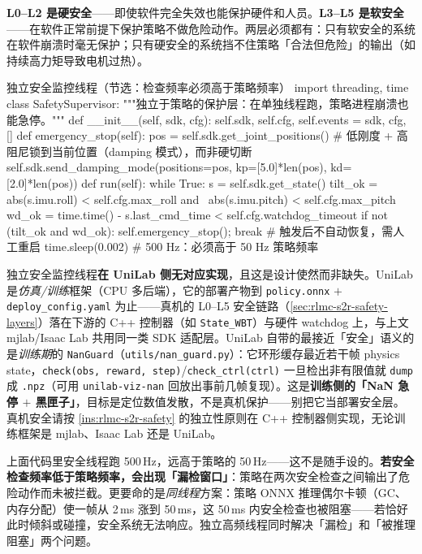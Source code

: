 \textbf{L0--L2 是硬安全}——即使软件完全失效也能保护硬件和人员。\textbf{L3--L5 是软安全}——在软件正常前提下保护策略不做危险动作。两层必须都有：只有软安全的系统在软件崩溃时毫无保护；只有硬安全的系统挡不住策略「合法但危险」的输出（如持续高力矩导致电机过热）。

\begin{codebox}[Python]{独立安全监控线程（节选：检查频率必须高于策略频率）}
import threading, time
class SafetySupervisor:
    """独立于策略的保护层：在单独线程跑，策略进程崩溃也能急停。"""
    def __init__(self, sdk, cfg):
        self.sdk, self.cfg, self.events = sdk, cfg, []
    def emergency_stop(self):
        pos = self.sdk.get_joint_positions()
        # 低刚度 + 高阻尼锁到当前位置（damping 模式），而非硬切断
        self.sdk.send_damping_mode(positions=pos,
                                   kp=[5.0]*len(pos), kd=[2.0]*len(pos))
    def run(self):
        while True:
            s = self.sdk.get_state()
            tilt_ok = abs(s.imu.roll) < self.cfg.max_roll and \
                      abs(s.imu.pitch) < self.cfg.max_pitch
            wd_ok   = time.time() - s.last_cmd_time < self.cfg.watchdog_timeout
            if not (tilt_ok and wd_ok):
                self.emergency_stop(); break        # 触发后不自动恢复，需人工重启
            time.sleep(0.002)                        # 500 Hz：必须高于 50 Hz 策略频率
\end{codebox}

\begin{note}
独立安全监控线程\textbf{在 UniLab 侧无对应实现}，且这是设计使然而非缺失。UniLab 是\emph{仿真/训练}框架（CPU 多后端），它的部署产物到 \verb|policy.onnx| $+$ \verb|deploy_config.yaml| 为止——真机的 L0--L5 安全链路（\cref{sec:rlmc-s2r-safety-layers}）落在下游的 C++ 控制器（如 \verb|State_WBT|）与硬件 watchdog 上，与上文 mjlab/Isaac Lab 共用同一类 SDK 适配层。UniLab 自带的最接近「安全」语义的是\emph{训练期}的 \texttt{NanGuard}（\texttt{utils/nan\_guard.py}）：它环形缓存最近若干帧 physics state，\verb|check(obs, reward, step)|/\verb|check_ctrl(ctrl)| 一旦检出非有限值就 \verb|dump| 成 \verb|.npz|（可用 \verb|unilab-viz-nan| 回放出事前几帧复现）。这是\textbf{训练侧的「NaN 急停 $+$ 黑匣子」}，目标是定位数值发散，不是真机保护——别把它当部署安全层。真机安全请按 \cref{ins:rlmc-s2r-safety} 的独立性原则在 C++ 控制器侧实现，无论训练框架是 mjlab、Isaac Lab 还是 UniLab。
\end{note}

\begin{insight}[为什么安全检查频率必须高于策略频率]\label{ins:rlmc-s2r-safety-freq}
上面代码里安全线程跑 500\,Hz，远高于策略的 50\,Hz——这不是随手设的。\textbf{若安全检查频率低于策略频率，会出现「漏检窗口」}：策略在两次安全检查之间输出了危险动作而未被拦截。更要命的是\emph{同线程}方案：策略 ONNX 推理偶尔卡顿（GC、内存分配）使一帧从 2\,ms 涨到 50\,ms，这 50\,ms 内安全检查也被阻塞——若恰好此时倾斜或碰撞，安全系统无法响应。独立高频线程同时解决「漏检」和「被推理阻塞」两个问题。
\end{insight}

